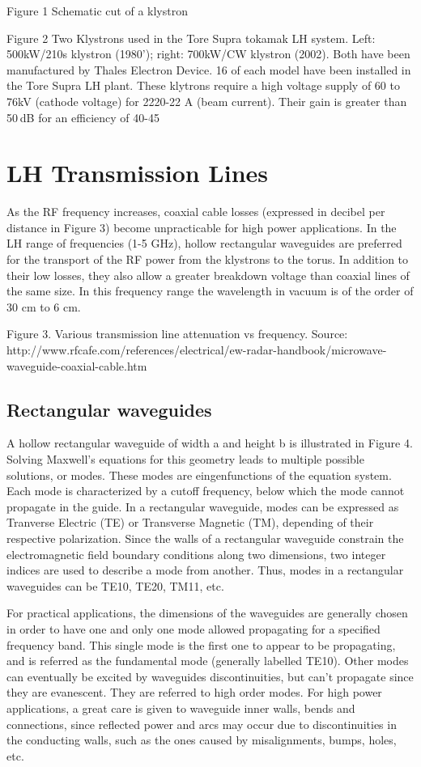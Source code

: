 Figure 1 Schematic cut of a klystron


Figure 2 Two Klystrons used in the Tore Supra tokamak LH system. Left: 500kW/210s klystron (1980'); right: 700kW/CW klystron (2002). Both have been manufactured by Thales Electron Device. 16 of each model have been installed in the Tore Supra LH plant. These klytrons require a high voltage supply of 60 to 76kV (cathode voltage) for 2220-22 A (beam current). Their gain is greater than 50 dB for an efficiency of 40-45%

\section{LH Transmission Lines}
As the RF frequency increases, coaxial cable losses (expressed in decibel per distance in Figure 3) become unpracticable for high power applications. In the LH range of frequencies (1-5 GHz), hollow rectangular waveguides are preferred for the transport of the RF power from the klystrons to the torus. In addition to their low losses, they also allow a greater breakdown voltage than coaxial lines of the same size. In this frequency range the wavelength in vacuum is of the order of 30 cm to 6 cm.

Figure 3. Various transmission line attenuation vs frequency. Source: http://www.rfcafe.com/references/electrical/ew-radar-handbook/microwave-waveguide-coaxial-cable.htm

\subsection{Rectangular waveguides} 
A hollow rectangular waveguide of width a and height b is illustrated in Figure 4. Solving Maxwell’s equations for this geometry leads to multiple possible solutions, or modes. These modes are eingenfunctions of the equation system. Each mode is characterized by a cutoff frequency, below which the mode cannot propagate in the guide. In a rectangular waveguide, modes can be expressed as Tranverse Electric (TE) or Transverse Magnetic (TM), depending of their respective polarization. Since the walls of a rectangular waveguide constrain the electromagnetic field boundary conditions along two dimensions, two integer indices are used to describe a mode from another. Thus, modes in a rectangular waveguides can be TE10, TE20, TM11, etc. 

For practical applications, the dimensions of the waveguides are generally chosen in order to have one and only one mode allowed propagating for a specified frequency band. This single mode is the first one to appear to be propagating, and is referred as the fundamental mode (generally labelled TE10). Other modes can eventually be excited by waveguides discontinuities, but can’t propagate since they are evanescent. They are referred to high order modes.
For high power applications, a great care is given to waveguide inner walls, bends and connections, since reflected power and arcs may occur due to discontinuities in the conducting walls, such as the ones caused by misalignments, bumps, holes, etc.


